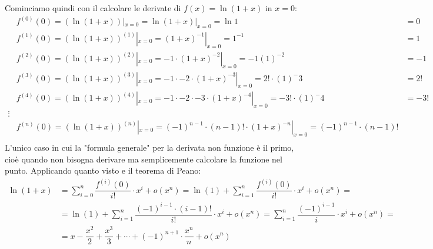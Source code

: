 Cominciamo quindi con il calcolare le derivate di $f(x) = \ln{(1 + x)}$ in 
$x = 0$:
\begin{align*}
	&f^{(0)}(0) = (\ln{(1+x)}) |_{x = 0} = \ln{(1 + x)} |_{x = 0} = \ln{1} 
    &= 0\\[5pt]
	&f^{(1)}(0) = (\ln{(1+x)})^{(1)}|_{x = 0} = (1+x)^{-1} |_{x = 0} = 1^{-1} 
    &= 1\\[5pt]
	&f^{(2)}(0) = (\ln{(1+x)})^{(2)} |_{x = 0} = -1 \cdot (1+x)^{-2} |_{x = 0} 
    = -1(1)^{-2} &= -1\\[5pt]
	&f^{(3)}(0) = (\ln{(1+x)})^{(3)} |_{x = 0} = -1 \cdot - 2 \cdot (1+x)^{-3} 
    |_{x = 0} = 2! \cdot (1)^-3 &= 2!\\
	&f^{(4)}(0) = (\ln{(1+x)})^{(4)} |_{x = 0} = -1 \cdot - 2 \cdot -3 \cdot 
    (1+x)^{-4} |_{x = 0} = -3! \cdot (1)^-4 &= -3!\\
	\vdots\\
	&f^{(n)}(0) = (\ln{(1+x)})^{(n)} |_{x = 0} = (-1)^{n-1} \cdot (n-1)! \cdot 
    (1+x)^{-n} |_{x = 0} = (-1)^{n-1} \cdot (n-1)!\\
\end{align*}
L'unico caso in cui la "formula generale" per la derivata non funzione è il 
primo, cioè quando non bisogna derivare ma semplicemente calcolare la funzione 
nel punto. Applicando quanto visto e il teorema di Peano:
\begin{align*}
	\ln{(1 + x)} &= \sum \limits_{i = 0}^n \dfrac{f^{(i)}(0)}{i!} \cdot x^i + 
    o(x^n) = \ln(1) + \sum \limits_{i = 1}^n \dfrac{f^{(i)}(0)}{i!} \cdot x^i + 
    o(x^n) = \\[5pt]
	&= \ln(1) + \sum \limits_{i = 1}^n \dfrac{(-1)^{i-1} \cdot (i -1)!}{i!} 
    \cdot x^i + o(x^n) = \sum \limits_{i = 1}^n \dfrac{(-1)^{i-1}}{i} 
    \cdot x^i + o(x^n) =\\[5pt]
	&= x - \dfrac{x^2}{2} + \dfrac{x^3}{3} + \cdots + (-1)^{n+1} \cdot 
    \dfrac{x^n}{n} + o(x^n)
\end{align*}

